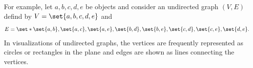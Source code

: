 For example, let $a, b, c, d, e$ be objects and consider an undirected graph $(V, E)$ defind by
$V = \set{a, b, c, d, e}$
and
  \[
E = \set*{\set{a, b}, \set{a, c}, \set{a, e}, \set{b, d}, \set{b, e}, \set{c, d}, \set{c, e}, \set{d,e}}.
  \]
In visualizations of undirected graphs, the vertices are frequently represented as circles or rectangles in the plane and edges are shown as lines connecting the vertices.


